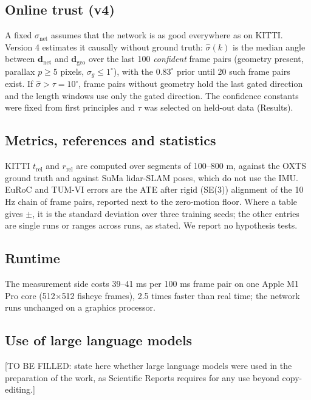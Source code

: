 \documentclass[pdflatex,sn-nature]{sn-jnl}
\newcommand{\dnet}{\mathbf{d}_{\mathrm{net}}}
\newcommand{\dgeo}{\mathbf{d}_{\mathrm{geo}}}
\begin{document}
\subsection{Online trust (v4)}

A fixed $\sigma_\mathrm{net}$ assumes that the network is as good everywhere as on KITTI. Version 4 estimates it causally without ground truth: $\hat\sigma(k)$ is the median angle between $\dnet$ and $\dgeo$ over the last 100 \emph{confident} frame pairs (geometry present, parallax $p\ge5$ pixels, $\sigma_g\le1^\circ$), with the $0.83^\circ$ prior until 20 such frame pairs exist. If $\hat\sigma>\tau=10^\circ$, frame pairs without geometry hold the last gated direction and the length windows use only the gated direction. The confidence constants were fixed from first principles and $\tau$ was selected on held-out data (Results).

\subsection{Metrics, references and statistics}

KITTI $t_\mathrm{rel}$ and $r_\mathrm{rel}$ are computed over segments of 100--800 m, against the OXTS ground truth and against SuMa lidar-SLAM poses\cite{Behley2018}, which do not use the IMU. EuRoC and TUM-VI errors are the ATE after rigid (SE(3)) alignment of the 10 Hz chain of frame pairs, reported next to the zero-motion floor. Where a table gives $\pm$, it is the standard deviation over three training seeds; the other entries are single runs or ranges across runs, as stated. We report no hypothesis tests.

\subsection{Runtime}

The measurement side costs 39--41 ms per 100 ms frame pair on one Apple M1 Pro core (512$\times$512 fisheye frames), 2.5 times faster than real time; the network runs unchanged on a graphics processor.

\subsection{Use of large language models}

[TO BE FILLED: state here whether large language models were used in the preparation of the work, as Scientific Reports requires for any use beyond copy-editing.]
\end{document}
